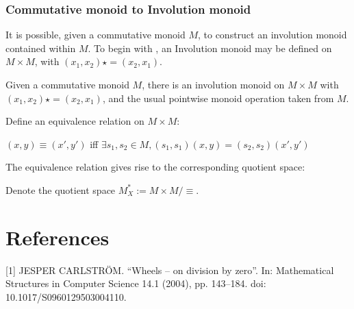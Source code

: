 \subsection{Commutative monoid to Involution monoid}
It is possible, given a commutative monoid $M$, to construct an involution monoid contained within $M$. To begin with , an Involution
monoid may be defined on $M \times M$, with $(x_{1},x_{2})\star = (x_{2},x_{1})$.
\begin{definition}
  \leanok
  Given a commutative monoid $M$, there is an involution monoid on $M \times M$ with $(x_{1},x_{2})\star = (x_{2},x_{1})$, and 
  the usual pointwise monoid operation taken from $M$.
\end{definition}
Define an equivalence relation on $M \times M$:
\begin{definition}
  \leanok
  $(x,y) \equiv (x',y')$ iff $\exists s_{1}, s_{2} \in M,(s_{1},s_{1})(x,y) = (s_{2},s_{2})(x',y')$
\end{definition}
The equivalence relation gives rise to the corresponding quotient space:
\begin{definition}
  \leanok
  Denote the quotient space $M^{*}_{X} := M \times M / \equiv$.
\end{definition}
\chapter{References}
[1] JESPER CARLSTRÖM. “Wheels – on division by zero”. In: Mathematical Structures in Computer Science 14.1 (2004), pp. 143–184. doi: 10.1017/S0960129503004110.